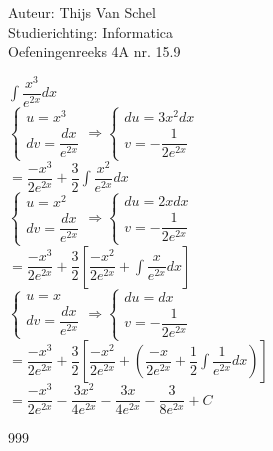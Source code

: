 \documentclass[a4paper]{article}
\newcommand{\dint}{\displaystyle\int}
\begin{document}
  
\noindent \large Auteur: Thijs Van Schel \\
\noindent \large Studierichting: Informatica\\
\noindent \large Oefeningenreeks 4A nr. 15.9\\

\medskip

\normalsize

$\dint \dfrac{x^3}{e^{2x}}dx$\\

$\left\{
\begin{array}{l}
u = x^3 \\
dv = \dfrac{dx}{e^{2x}}
\end{array}
\right.
\Rightarrow
\left\{
\begin{array}{l}
du = 3x^2dx \\
v = -\dfrac{1}{2e^{2x}}
\end{array}
\right.$\\

$= \dfrac{-x^3}{2e^{2x}} + \dfrac{3}{2}\dint \dfrac{x^2}{e^{2x}}dx$\\

$\left\{
\begin{array}{l}
u = x^2 \\
dv = \dfrac{dx}{e^{2x}}
\end{array}
\right.
\Rightarrow
\left\{
\begin{array}{l}
du = 2xdx \\
v = -\dfrac{1}{2e^{2x}}
\end{array}
\right.$\\

$= \dfrac{-x^3}{2e^{2x}} + \dfrac{3}{2}\left[\dfrac{-x^2}{2e^{2x}}+\dint \dfrac{x}{e^{2x}}dx\right]$\\

$\left\{
\begin{array}{l}
u = x \\
dv = \dfrac{dx}{e^{2x}}
\end{array}
\right.
\Rightarrow
\left\{
\begin{array}{l}
du = dx \\
v = -\dfrac{1}{2e^{2x}}
\end{array}
\right.$\\

$= \dfrac{-x^3}{2e^{2x}} + \dfrac{3}{2}\left[\dfrac{-x^2}{2e^{2x}}+\left(\dfrac{-x}{2e^{2x}}+\dfrac{1}{2}\dint \dfrac{1}{e^{2x}}dx\right)\right]$\\

$= \dfrac{-x^3}{2e^{2x}} - \dfrac{3x^2}{4e^{2x}}- \dfrac{3x}{4e^{2x}}-\dfrac{3}{8e^{2x}} + C$

\begin{thebibliography}{999}
\end{thebibliography}
\end{document}

